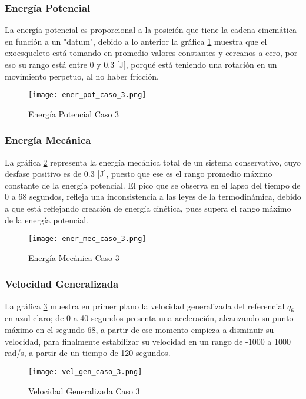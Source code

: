    \subsubsection{Energía Potencial}

    La energía potencial es proporcional a la posición que tiene la cadena cinemática en función a un "datum", debido a lo anterior la gráfica \ref{fig:ePotC3} muestra que el exoesqueleto está tomando en promedio valores constantes y cercanos a cero, por eso su rango está entre 0 y 0.3 [J], porqué está teniendo una rotación en un movimiento perpetuo, al no haber fricción. 

    \begin{figure} [H]%
            \centering
            \texttt{[image: ener\_pot\_caso\_3.png]} 
        \caption{Energía Potencial Caso 3}
        \label{fig:ePotC3}
    \end{figure}

    \subsubsection{Energía Mecánica}

    La gráfica \ref{fig:eMecC3} representa la energía mecánica total de un sistema conservativo, cuyo desfase positivo es de 0.3 [J], puesto que ese es el rango promedio máximo constante de la energía potencial. El pico que se observa en el lapso del tiempo de 0 a 68 segundos, refleja una inconsistencia a las leyes de la termodinámica, debido a que está reflejando creación de energía cinética, pues supera el rango máximo de la energía potencial.

    \begin{figure}[H]%
            \centering
            \texttt{[image: ener\_mec\_caso\_3.png]} 
        \caption{Energía Mecánica Caso 3}
        \label{fig:eMecC3}
    \end{figure}

    \subsubsection{Velocidad Generalizada}

    La gráfica \ref{fig:VelGenC3} muestra en primer plano la velocidad generalizada del referencial $q_6$ en azul claro; de 0 a 40 segundos presenta una aceleración, alcanzando su punto máximo en el segundo 68, a partir de ese momento empieza a disminuir su velocidad, para finalmente estabilizar su velocidad en un rango de -1000 a 1000 rad/s, a partir de un tiempo de 120 segundos. 

    \begin{figure}[H]%
            \centering
            \texttt{[image: vel\_gen\_caso\_3.png]} 
        \caption{Velocidad Generalizada Caso 3}
        \label{fig:VelGenC3}
    \end{figure}